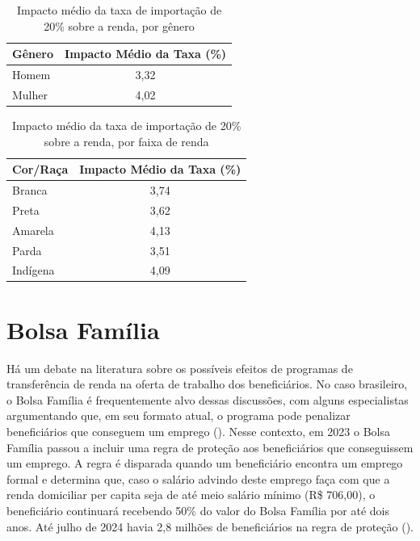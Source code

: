 \documentclass[12pt, a4paper, openany]{book}
\numberwithin{equation}{chapter}
\numberwithin{table}{chapter}
\numberwithin{figure}{chapter}
\theoremstyle{break}
\begin{document}
\begin{table}[H]
\centering
\begin{tabular}{l|c}
\textbf{Gênero} & \textbf{Impacto Médio da Taxa (\%)} \\ \hline
Homem                     & 3,32                               \\ \hline
Mulher                   & 4,02
\end{tabular}
\caption{Impacto médio da taxa de importação de 20\% sobre a renda, por gênero}
\label{tab: impacto_taxa_genero}
\end{table}

\begin{table}[H]
\centering
\begin{tabular}{l|c}
\textbf{Cor/Raça} & \textbf{Impacto Médio da Taxa (\%)} \\ \hline
Branca                     & 3,74                              \\ \hline
Preta                   & 3,62                           \\ \hline
Amarela                  & 4,13                              \\ \hline
Parda                & 3,51                              \\ \hline
Indígena                & 4,09
\end{tabular}
\caption{Impacto médio da taxa de importação de 20\% sobre a renda, por faixa de renda}
\label{tab: impacto_taxa_cor}
\end{table}

\section{Bolsa Família}

Há um debate na literatura sobre os possíveis efeitos de programas de transferência de renda na oferta de trabalho dos beneficiários. No caso brasileiro, o Bolsa Família é frequentemente alvo dessas discussões, com alguns especialistas argumentando que, em seu formato atual, o programa pode penalizar beneficiários que conseguem um emprego (\cite{bbc_bf}). Nesse contexto, em 2023 o Bolsa Família passou a incluir uma regra de proteção aos beneficiários que conseguissem um emprego. A regra é disparada quando um beneficiário encontra um emprego formal e determina que, caso o salário advindo deste emprego faça com que a renda domiciliar per capita seja de até meio salário mínimo (R\$ 706,00), o beneficiário continuará recebendo 50\% do valor do Bolsa Família por até dois anos. Até julho de 2024 havia 2,8 milhões de beneficiários na regra de proteção (\cite{poder360_bf}). 
\end{document}
